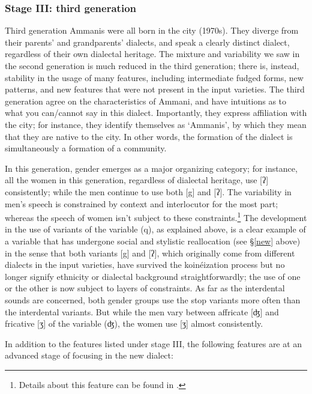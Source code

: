 \documentclass[output=paper]{langsci/langscibook}
\begin{document}
\subsubsection{Stage III: third generation}

Third generation Ammanis were all born in the city (1970s). They diverge from their parents’ and grandparents’ dialects, and speak a clearly distinct dialect, regardless of their own dialectal heritage. The mixture and variability we saw in the second generation is much reduced in the third generation; there is, instead, stability in the usage of many features, including intermediate fudged forms, new patterns, and new features that were not present in the input varieties. The third generation agree on the characteristics of Ammani, and have intuitions as to what you can/cannot say in this dialect. Importantly, they express affiliation with the city; for instance, they identify themselves as ‘Ammanis’, by which they mean that they are native to the city. In other words, the formation of the dialect is simultaneously a formation of a community.

In this generation, gender emerges as a major organizing category; for instance, all the women in this generation, regardless of dialectal heritage, use [ʔ] consistently; while the men continue to use both [g] and [ʔ]. The variability in men’s speech is constrained by context and interlocutor for the most part; whereas the speech of women isn’t subject to these constraints.\footnote{Details about this feature can be found in \citet{Al-WerHerin2011}.} The development in the use of variants of the variable (q), as explained above, is a clear example of a variable that has undergone social and stylistic reallocation (see §\ref{new} above) in the sense that both variants [g] and [ʔ], which originally come from different dialects in the input varieties, have survived the koinéization process but no longer signify ethnicity or dialectal background straightforwardly; the use of one or the other is now subject to layers of constraints. As far as the interdental sounds are concerned, both gender groups use the stop variants more often than the interdental variants. But while the men vary between affricate [ʤ] and fricative [ʒ] of the variable (ʤ), the women use [ʒ] almost consistently.

In addition to the features listed under stage III, the following features are at an advanced stage of focusing in the new dialect:
\end{document}
